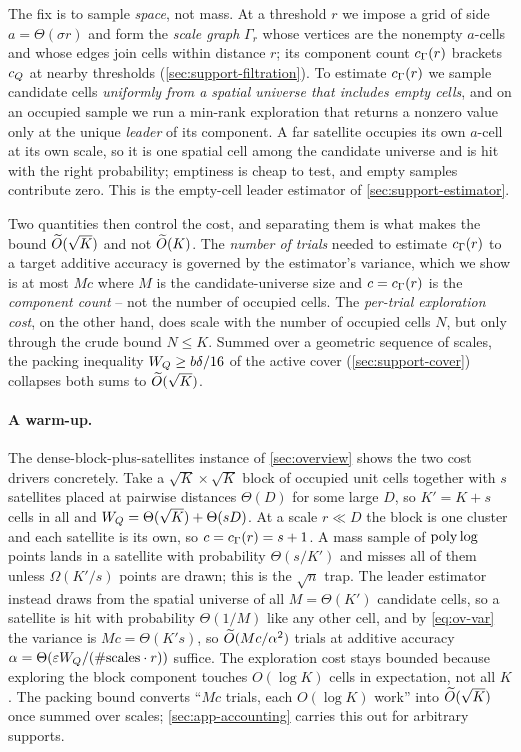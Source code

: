 The fix is to sample \emph{space}, not mass. At a threshold $r$ we impose a grid of side $a=\Theta(\sigma
r)$ and form the \emph{scale graph} $\Gamma_r$ whose vertices are the nonempty $a$-cells and whose edges
join cells within distance $r$; its component count $c_\Gamma(r)$ brackets $c_Q$ at nearby thresholds
(\cref{sec:support-filtration}). To estimate $c_\Gamma(r)$ we sample candidate cells \emph{uniformly from a
spatial universe that includes empty cells}, and on an occupied sample we run a min-rank exploration that
returns a nonzero value only at the unique \emph{leader} of its component. A far satellite occupies its
own $a$-cell at its own scale, so it is one spatial cell among the candidate universe and is hit with the
right probability; emptiness is cheap to test, and empty samples contribute zero. This is the empty-cell
leader estimator of \cref{sec:support-estimator}.

Two quantities then control the cost, and separating them is what makes the bound $\widetilde{O}(\sqrt K)$ and not
$\widetilde{O}(K)$. The \emph{number of trials} needed to estimate $c_\Gamma(r)$ to a target additive accuracy is
governed by the estimator's variance, which we show is at most $M c$ where $M$ is the candidate-universe
size and $c=c_\Gamma(r)$ is the \emph{component count} -- not the number of occupied cells. The \emph{per-trial
exploration cost}, on the other hand, does scale with the number of occupied cells $N$, but only through
the crude bound $N\le K$. Summed over a geometric sequence of scales, the packing inequality $W_Q\ge
b\delta/16$ of the active cover (\cref{sec:support-cover}) collapses both sums to $\widetilde{O}(\sqrt K)$.

\paragraph{A warm-up.}
The dense-block-plus-satellites instance of \cref{sec:overview} shows the two cost drivers concretely.
Take a $\sqrt K\times\sqrt K$ block of occupied unit cells together with $s$ satellites placed at pairwise
distances $\Theta(D)$ for some large $D$, so $K'=K+s$ cells in all and $W_Q=\Theta(\sqrt K)+\Theta(sD)$.
At a scale $r\ll D$ the block is one cluster and each satellite is its own, so $c=c_\Gamma(r)=s+1$. A mass
sample of $\operatorname{poly}\log$ points lands in a satellite with probability $\Theta(s/K')$ and misses all of them
unless $\Omega(K'/s)$ points are drawn; this is the $\sqrt n$ trap. The leader estimator instead draws
from the spatial universe of all $M=\Theta(K')$ candidate cells, so a satellite is hit with probability
$\Theta(1/M)$ like any other cell, and by \eqref{eq:ov-var} the variance is $Mc=\Theta(K' s)$, so
$\widetilde{O}(M c/\alpha^2)$ trials at additive accuracy $\alpha=\Theta(\varepsilon W_Q/(\text{\#scales}\cdot r))$ suffice.
The exploration cost stays bounded because exploring the block component touches $O(\log K)$ cells in
expectation, not all $K$. The packing bound converts ``$M c$ trials, each $O(\log K)$ work'' into
$\widetilde{O}(\sqrt K)$ once summed over scales; \cref{sec:app-accounting} carries this out for arbitrary
supports.

